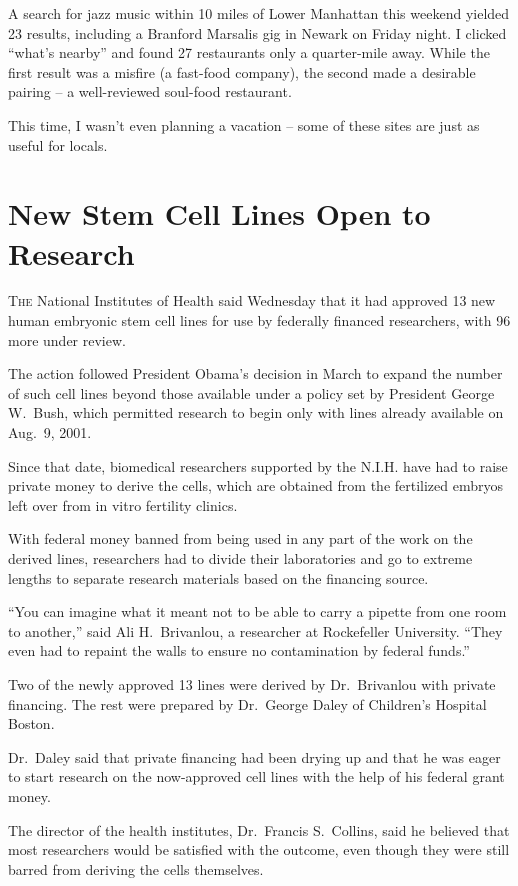 ﻿\documentclass[12pt]{article}
\begin{document}
A search for jazz music within 10 miles of Lower Manhattan this weekend yielded 23 results,
including a Branford Marsalis gig in Newark on Friday night. I clicked ``what's nearby'' and found
27 restaurants only a quarter-mile away. While the first result was a misfire (a fast-food company),
the second made a desirable pairing -- a well-reviewed soul-food restaurant.

This time, I wasn't even planning a vacation -- some of these sites are just as useful for locals.

\section{New Stem Cell Lines Open to Research}

\lettrine{T}{he} National Institutes of Health said Wednesday that it had
approved 13 new human embryonic stem cell lines for use by federally financed researchers, with 96
more under review.

The action followed President Obama's decision in March to expand the number of such cell lines
beyond those available under a policy set by President George W.~Bush, which permitted research to
begin only with lines already available on Aug.~9, 2001.

Since that date, biomedical researchers supported by the N.I.H. have had to raise private money to
derive the cells, which are obtained from the fertilized embryos left over from in vitro fertility
clinics.

With federal money banned from being used in any part of the work on the derived lines, researchers
had to divide their laboratories and go to extreme lengths to separate research materials based on
the financing source.

``You can imagine what it meant not to be able to carry a pipette from one room to another,'' said
Ali H.~Brivanlou, a researcher at Rockefeller University. ``They even had to repaint the walls to
ensure no contamination by federal funds.''

Two of the newly approved 13 lines were derived by Dr.~Brivanlou with private financing. The rest
were prepared by Dr.~George Daley of Children's Hospital Boston.

Dr.~Daley said that private financing had been drying up and that he was eager to start research on
the now-approved cell lines with the help of his federal grant money.

The director of the health institutes, Dr.~Francis S.~Collins, said he believed that most
researchers would be satisfied with the outcome, even though they were still barred from deriving
the cells themselves.
\end{document}
